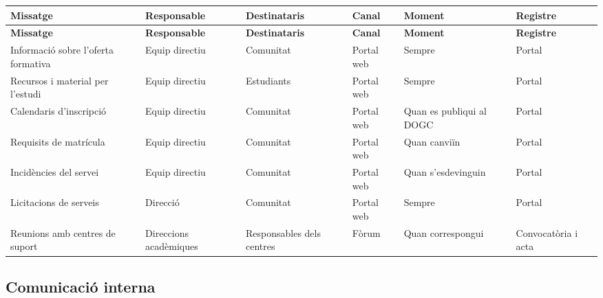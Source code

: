 \documentclass[fontsize=10pt,%
paper=a4,%
DIV=14,%
pagesize=auto,%
parskip=half,
captions=tableheading,%
numbers=noenddot,%
toc=graduated%
]{scrartcl}
\renewcommand{\arraystretch}{1.75}%
\renewcommand{\arraystretch}{1.75}%
\begin{document}
\small{
\setlength{\tabcolsep}{10pt}
\renewcommand{\arraystretch}{1.5}
\begin{longtable}{p{3cm}p{2cm}p{2cm}p{1.5cm}p{2cm}p{1.5cm}}
\hline
\textbf{Missatge}                   & \textbf{Responsable}   & \textbf{Destinataris}     & \textbf{Canal} & \textbf{Moment}          & \textbf{Registre}   \\
\hline \endfirsthead
\hline
\textbf{Missatge}                   & \textbf{Responsable}   & \textbf{Destinataris}     & \textbf{Canal} & \textbf{Moment}          & \textbf{Registre}   \\
\hline \endhead
Informació sobre l'oferta formativa & Equip directiu         & Comunitat                 & Portal web     & Sempre                   & Portal              \\
Recursos i material per l'estudi    & Equip directiu         & Estudiants                & Portal web     & Sempre                   & Portal              \\
Calendaris d'inscripció             & Equip directiu         & Comunitat                 & Portal web     & Quan es publiqui al DOGC & Portal              \\
Requisits de matrícula              & Equip directiu         & Comunitat                 & Portal web     & Quan canviïn             & Portal              \\
Incidències del servei              & Equip directiu         & Comunitat                 & Portal web     & Quan s'esdevinguin       & Portal              \\
Licitacions de serveis              & Direcció               & Comunitat                 & Portal web     & Sempre                   & Portal              \\
Reunions amb centres de suport      & Direccions acadèmiques & Responsables dels centres & Fòrum          & Quan correspongui        & Convocatòria i acta \\
\end{longtable}
}%



\subsection{Comunicació interna}
\end{document}
